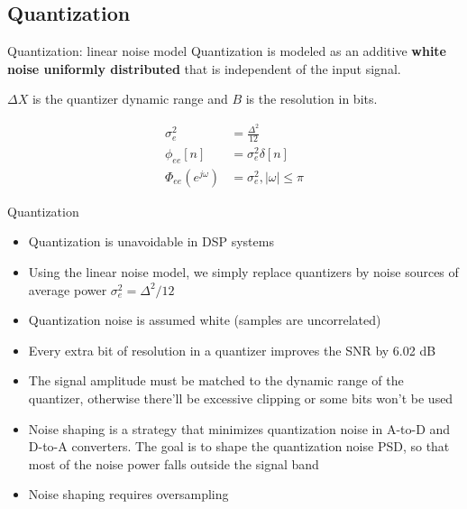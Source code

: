 \documentclass[10pt]{beamer}
\begin{document}
\subsection{Quantization}
\begin{frame}{Quantization: linear noise model}
Quantization is modeled as an additive \textbf{white noise uniformly distributed} that is independent of the input signal. 

\begin{center}
	\resizebox{0.75\textwidth}{!}{}
\end{center}
\vspace{-0.3cm}

$\Delta X$ is the quantizer dynamic range and $B$ is the resolution in bits.

\begin{align*}
\sigma_e^2 &= \frac{\Delta^2}{12} \tag{average power} \\
\phi_{ee}[n] &= \sigma_e^2\delta[n] \tag{autocorrelation function} \\
\Phi_{ee}(e^{j\omega}) &= \sigma_e^2, |\omega| \leq \pi \tag{PSD}
\end{align*}
\end{frame}

%
\begin{frame}{Quantization}
\begin{itemize}
	\item Quantization is unavoidable in DSP systems
	\item Using the linear noise model, we simply replace quantizers by noise sources of average power $\sigma_e^2 = \Delta^2/12$
	\item Quantization noise is assumed white (samples are uncorrelated)
	\item Every extra bit of resolution in a quantizer improves the SNR by 6.02 dB
	\item The signal amplitude must be matched to the dynamic range of the quantizer, otherwise there'll be excessive clipping or some bits won't be used
	\item Noise shaping is a strategy that minimizes quantization noise in A-to-D and D-to-A converters. The goal is to shape the quantization noise PSD, so that most of the noise power falls outside the signal band
	\item Noise shaping requires oversampling
\end{itemize}
\end{frame}

%
\end{document}
